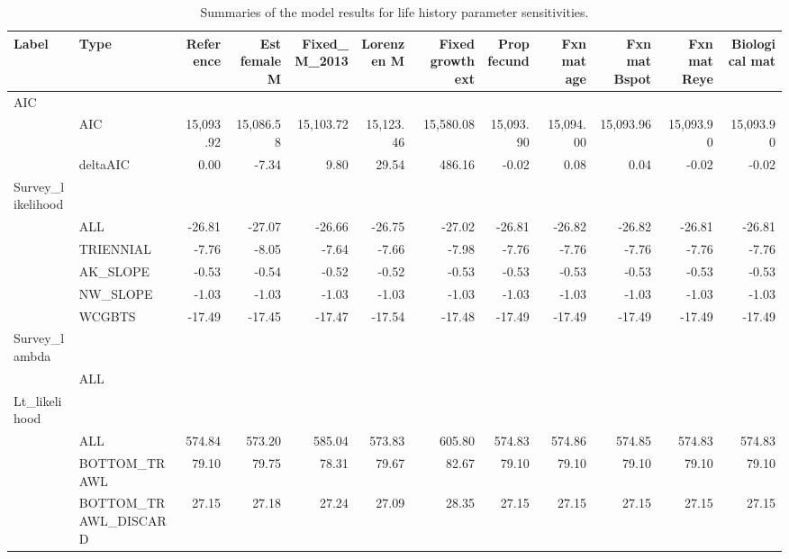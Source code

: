 \documentclass[
]{scrartcl}
\begin{document}
\newpage{}

\begin{landscape}
\begingroup
\fontsize{9.0pt}{10.8pt}\selectfont

\begin{longtable}{llrrrrrrrrrr}

\caption{\label{tbl-sensitivities-life-history}Summaries of the model
results for life history parameter sensitivities.}

\tabularnewline

\toprule
Label & Type & Reference & Est female M & Fixed\_M\_2013 & Lorenzen M & Fixed growth ext & Prop fecund & Fxn mat age & Fxn mat Bspot & Fxn mat Reye & Biological mat \\ 
\midrule\addlinespace[2.5pt]
AIC &  &  &  &  &  &  &  &  &  &  &  \\ 
 & AIC & 15,093.92 & 15,086.58 & 15,103.72 & 15,123.46 & 15,580.08 & 15,093.90 & 15,094.00 & 15,093.96 & 15,093.90 & 15,093.90 \\ 
 & deltaAIC & 0.00 & -7.34 & 9.80 & 29.54 & 486.16 & -0.02 & 0.08 & 0.04 & -0.02 & -0.02 \\ 
Survey\_likelihood &  &  &  &  &  &  &  &  &  &  &  \\ 
 & ALL & -26.81 & -27.07 & -26.66 & -26.75 & -27.02 & -26.81 & -26.82 & -26.82 & -26.81 & -26.81 \\ 
 & TRIENNIAL & -7.76 & -8.05 & -7.64 & -7.66 & -7.98 & -7.76 & -7.76 & -7.76 & -7.76 & -7.76 \\ 
 & AK\_SLOPE & -0.53 & -0.54 & -0.52 & -0.52 & -0.53 & -0.53 & -0.53 & -0.53 & -0.53 & -0.53 \\ 
 & NW\_SLOPE & -1.03 & -1.03 & -1.03 & -1.03 & -1.03 & -1.03 & -1.03 & -1.03 & -1.03 & -1.03 \\ 
 & WCGBTS & -17.49 & -17.45 & -17.47 & -17.54 & -17.48 & -17.49 & -17.49 & -17.49 & -17.49 & -17.49 \\ 
Survey\_lambda &  &  &  &  &  &  &  &  &  &  &  \\ 
 & ALL &  &  &  &  &  &  &  &  &  &  \\ 
Lt\_likelihood &  &  &  &  &  &  &  &  &  &  &  \\ 
 & ALL & 574.84 & 573.20 & 585.04 & 573.83 & 605.80 & 574.83 & 574.86 & 574.85 & 574.83 & 574.83 \\ 
 & BOTTOM\_TRAWL & 79.10 & 79.75 & 78.31 & 79.67 & 82.67 & 79.10 & 79.10 & 79.10 & 79.10 & 79.10 \\ 
 & BOTTOM\_TRAWL\_DISCARD & 27.15 & 27.18 & 27.24 & 27.09 & 28.35 & 27.15 & 27.15 & 27.15 & 27.15 & 27.15 \\ 

\end{longtable}
\end{landscape}
\end{document}

